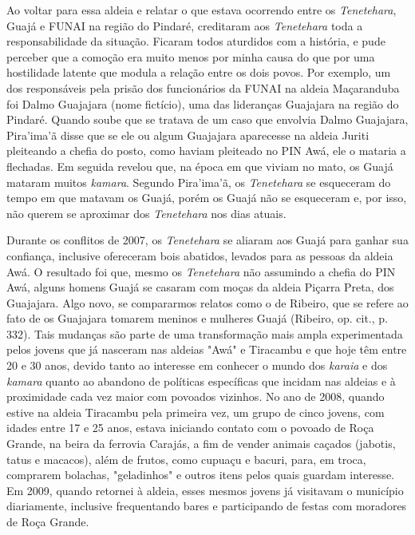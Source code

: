 Ao voltar para essa aldeia e relatar o que estava ocorrendo entre os
\emph{Tenetehara}, Guajá e FUNAI na região do Pindaré, creditaram aos
\emph{Tenetehara} toda a responsabilidade da situação. Ficaram todos
aturdidos com a história, e pude perceber que a comoção era muito menos
por minha causa do que por uma hostilidade latente que modula a relação
entre os dois povos. Por exemplo, um dos responsáveis pela prisão dos
funcionários da FUNAI na aldeia Maçaranduba foi Dalmo Guajajara (nome
fictício), uma das lideranças Guajajara na região do Pindaré. Quando
soube que se tratava de um caso que envolvia Dalmo Guajajara, Pira'ima'ã
disse que se ele ou algum Guajajara aparecesse na aldeia Juriti
pleiteando a chefia do posto, como haviam pleiteado no PIN Awá, ele o
mataria a flechadas. Em seguida revelou que, na época em que viviam no
mato, os Guajá mataram muitos \emph{kamara}. Segundo Pira'ima'ã, os
\emph{Tenetehara} se esqueceram do tempo em que matavam os Guajá, porém
os Guajá não se esqueceram e, por isso, não querem se aproximar dos
\emph{Tenetehara} nos dias atuais.

Durante os conflitos de 2007, os \emph{Tenetehara} se aliaram aos Guajá
para ganhar sua confiança, inclusive ofereceram bois abatidos, levados
para as pessoas da aldeia Awá. O resultado foi que, mesmo os
\emph{Tenetehara} não assumindo a chefia do PIN Awá, alguns homens Guajá
se casaram com moças da aldeia Piçarra Preta, dos Guajajara. Algo novo,
se compararmos relatos como o de Ribeiro, que se refere ao fato de os
Guajajara tomarem meninos e mulheres Guajá (Ribeiro, op. cit., p. 332).
Tais mudanças são parte de uma transformação mais ampla experimentada
pelos jovens que já nasceram nas aldeias "Awá" e Tiracambu e que hoje
têm entre 20 e 30 anos, devido tanto ao interesse em conhecer o mundo
dos \emph{karaia} e dos \emph{kamara} quanto ao abandono de políticas
específicas que incidam nas aldeias e à proximidade cada vez maior com
povoados vizinhos. No ano de 2008, quando estive na aldeia Tiracambu
pela primeira vez, um grupo de cinco jovens, com idades entre 17 e 25
anos, estava iniciando contato com o povoado de Roça Grande, na beira da
ferrovia Carajás, a fim de vender animais caçados (jabotis, tatus e
macacos), além de frutos, como cupuaçu e bacuri, para, em troca,
comprarem bolachas, "geladinhos" e outros itens pelos quais guardam
interesse. Em 2009, quando retornei à aldeia, esses mesmos jovens já
visitavam o município diariamente, inclusive frequentando bares e
participando de festas com moradores de Roça Grande.

